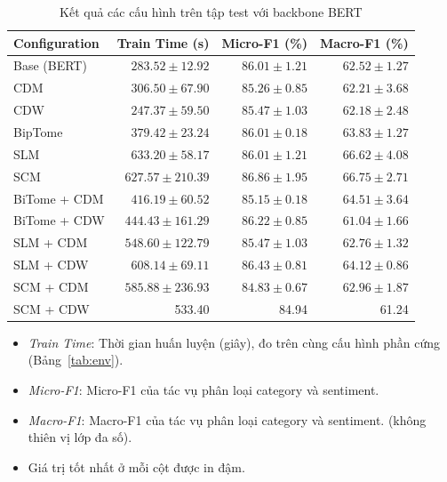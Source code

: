 \begin{table}[H]
\centering
\small
\caption{Kết quả các cấu hình trên tập test với backbone BERT}
\label{tab:bert_results}
\begin{tabular}{@{}lrrr@{}}
\toprule
\textbf{Configuration}
&
\textbf{Train Time (s)}
&
\textbf{Micro-F1 (\%)}
&
\textbf{Macro-F1 (\%)} \\
\midrule

Base (BERT)
& $283.52 \pm 12.92$
& $86.01 \pm 1.21$
& $62.52 \pm 1.27$ \\

CDM
& $306.50 \pm 67.90$
& $85.26 \pm 0.85$
& $62.21 \pm 3.68$ \\

CDW
& $\mathbf{247.37 \pm 59.50}$
& $85.47 \pm 1.03$
& $62.18 \pm 2.48$ \\

BipTome
& $379.42 \pm 23.24$
& $86.01 \pm 0.18$
& $63.83 \pm 1.27$ \\

SLM
& $633.20 \pm 58.17$
& $86.01 \pm 1.21$
& $66.62 \pm 4.08$ \\

SCM
& $627.57 \pm 210.39$
& $\mathbf{86.86 \pm 1.95}$
& $\mathbf{66.75 \pm 2.71}$ \\

BiTome + CDM
& $416.19 \pm 60.52$
& $85.15 \pm 0.18$
& $64.51 \pm 3.64$ \\

BiTome + CDW
& $444.43 \pm 161.29$
& $86.22 \pm 0.85$
& $61.04 \pm 1.66$ \\

SLM + CDM
& $548.60 \pm 122.79$
& $85.47 \pm 1.03$
& $62.76 \pm 1.32$ \\

SLM + CDW
& $608.14 \pm 69.11$
& $86.43 \pm 0.81$
& $64.12 \pm 0.86$ \\

SCM + CDM
& $585.88 \pm 236.93$
& $84.83 \pm 0.67$
& $62.96 \pm 1.87$ \\

SCM + CDW
& 533.40
& 84.94
& 61.24 \\

\bottomrule
\end{tabular}
\end{table}

\begin{itemize}
  \item \textit{Train Time}: Thời gian huấn luyện (giây), đo trên cùng
        cấu hình phần cứng (Bảng~\ref{tab:env}).
  \item \textit{Micro-F1}: Micro-F1 của tác vụ phân loại category và sentiment.
  \item \textit{Macro-F1}: Macro-F1 của tác vụ phân loại category và sentiment.
        (không thiên vị lớp đa số).

  \item Giá trị tốt nhất ở mỗi cột được in đậm.
\end{itemize}

